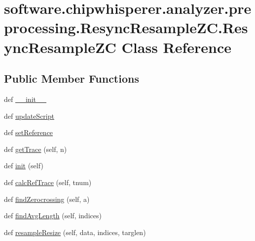 \hypertarget{classsoftware_1_1chipwhisperer_1_1analyzer_1_1preprocessing_1_1ResyncResampleZC_1_1ResyncResampleZC}{}\section{software.\+chipwhisperer.\+analyzer.\+preprocessing.\+Resync\+Resample\+Z\+C.\+Resync\+Resample\+Z\+C Class Reference}
\label{classsoftware_1_1chipwhisperer_1_1analyzer_1_1preprocessing_1_1ResyncResampleZC_1_1ResyncResampleZC}
\subsection*{Public Member Functions}
\begin{DoxyCompactItemize}
\item 
def \hyperlink{classsoftware_1_1chipwhisperer_1_1analyzer_1_1preprocessing_1_1ResyncResampleZC_1_1ResyncResampleZC_a3bf9f6afd0e1910fd72fa02e372d9ab8}{\+\_\+\+\_\+init\+\_\+\+\_\+}
\item 
def \hyperlink{classsoftware_1_1chipwhisperer_1_1analyzer_1_1preprocessing_1_1ResyncResampleZC_1_1ResyncResampleZC_ab15478a9a077469b9523cd0f005e59c8}{update\+Script}
\item 
def \hyperlink{classsoftware_1_1chipwhisperer_1_1analyzer_1_1preprocessing_1_1ResyncResampleZC_1_1ResyncResampleZC_af9ec5ff9a5af694f0556f8b33be00dc6}{set\+Reference}
\item 
def \hyperlink{classsoftware_1_1chipwhisperer_1_1analyzer_1_1preprocessing_1_1ResyncResampleZC_1_1ResyncResampleZC_a76519b1be15714aa4a3938da4b4d1dde}{get\+Trace} (self, n)
\item 
def \hyperlink{classsoftware_1_1chipwhisperer_1_1analyzer_1_1preprocessing_1_1ResyncResampleZC_1_1ResyncResampleZC_a651f9d9c785c8bbb34cef45402d41f0a}{init} (self)
\item 
def \hyperlink{classsoftware_1_1chipwhisperer_1_1analyzer_1_1preprocessing_1_1ResyncResampleZC_1_1ResyncResampleZC_a3123e88a94f0fe4373e06e53910850e8}{calc\+Ref\+Trace} (self, tnum)
\item 
def \hyperlink{classsoftware_1_1chipwhisperer_1_1analyzer_1_1preprocessing_1_1ResyncResampleZC_1_1ResyncResampleZC_ae3481747b69d8e37cd672cea331eac1e}{find\+Zerocrossing} (self, a)
\item 
def \hyperlink{classsoftware_1_1chipwhisperer_1_1analyzer_1_1preprocessing_1_1ResyncResampleZC_1_1ResyncResampleZC_a1feefa815d2cb7eff302e85abc9bc9a4}{find\+Avg\+Length} (self, indices)
\item 
def \hyperlink{classsoftware_1_1chipwhisperer_1_1analyzer_1_1preprocessing_1_1ResyncResampleZC_1_1ResyncResampleZC_afa24d2ce13dcaccae2612592d6484622}{resample\+Resize} (self, data, indices, targlen)
\end{DoxyCompactItemize}

